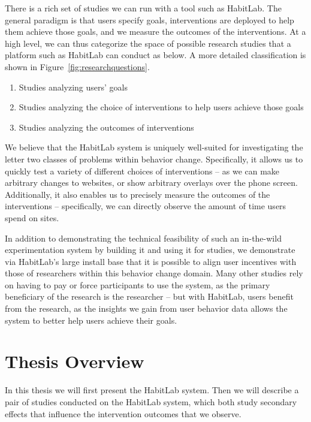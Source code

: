 There is a rich set of studies we can run with a tool such as HabitLab. The general paradigm is that users specify goals, interventions are deployed to help them achieve those goals, and we measure the outcomes of the interventions. At a high level, we can thus categorize the space of possible research studies that a platform such as HabitLab can conduct as below. A more detailed classification is shown in Figure~\ref{fig:researchquestions}.

\begin{enumerate}
\item Studies analyzing users' goals
\item Studies analyzing the choice of interventions to help users achieve those goals
\item Studies analyzing the outcomes of interventions
\end{enumerate}

We believe that the HabitLab system is uniquely well-suited for investigating the letter two classes of problems within behavior change. Specifically, it allows us to quickly test a variety of different choices of interventions -- as we can make arbitrary changes to websites, or show arbitrary overlays over the phone screen. Additionally, it also enables us to precisely measure the outcomes of the interventions -- specifically, we can directly observe the amount of time users spend on sites.

In addition to demonstrating the technical feasibility of such an in-the-wild experimentation system by building it and using it for studies, we demonstrate via HabitLab's large install base that it is possible to align user incentives with those of researchers within this behavior change domain. Many other studies rely on having to pay or force participants to use the system, as the primary beneficiary of the research is the researcher -- but with HabitLab, users benefit from the research, as the insights we gain from user behavior data allows the system to better help users achieve their goals.


\section{Thesis Overview}

In this thesis we will first present the HabitLab system. Then we will describe a pair of studies conducted on the HabitLab system, which both study secondary effects that influence the intervention outcomes that we observe. %

